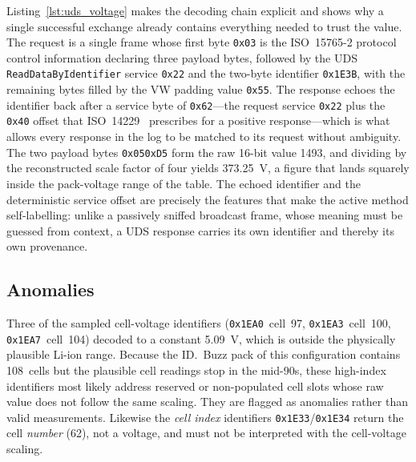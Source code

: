 \documentclass[11pt,a4paper,oneside,parskip=half]{scrreprt}
\newcommand{\udssid}[1]{\texttt{0x#1}}
\providecommand{\hex}{}\renewcommand{\hex}[1]{\texttt{0x#1}}
\begin{document}
Listing~\ref{lst:uds_voltage} makes the decoding chain explicit and shows why a single successful exchange already contains everything needed to trust the value. The request is a single frame whose first byte \hex{03} is the ISO~15765-2 protocol control information declaring three payload bytes, followed by the UDS \texttt{ReadDataByIdentifier} service \udssid{22} and the two-byte identifier \hex{1E3B}, with the remaining bytes filled by the VW padding value \hex{55}. The response echoes the identifier back after a service byte of \udssid{62}---the request service \udssid{22} plus the \hex{40} offset that ISO~14229~\cite{iso14229} prescribes for a positive response---which is what allows every response in the log to be matched to its request without ambiguity. The two payload bytes \hex{05}\hex{D5} form the raw 16-bit value 1493, and dividing by the reconstructed scale factor of four yields 373.25~V, a figure that lands squarely inside the pack-voltage range of the table. The echoed identifier and the deterministic service offset are precisely the features that make the active method self-labelling: unlike a passively sniffed broadcast frame, whose meaning must be guessed from context, a UDS response carries its own identifier and thereby its own provenance.

\subsection{Anomalies}
Three of the sampled cell-voltage identifiers (\hex{1EA0}~cell~97, \hex{1EA3}~cell~100, \hex{1EA7}~cell~104) decoded to a constant 5.09~V, which is outside the physically plausible Li-ion range. Because the ID.~Buzz pack of this configuration contains 108~cells but the plausible cell readings stop in the mid-90s, these high-index identifiers most likely address reserved or non-populated cell slots whose raw value does not follow the same scaling. They are flagged as anomalies rather than valid measurements. Likewise the \emph{cell index} identifiers \hex{1E33}/\hex{1E34} return the cell \emph{number} (62), not a voltage, and must not be interpreted with the cell-voltage scaling.
\end{document}
